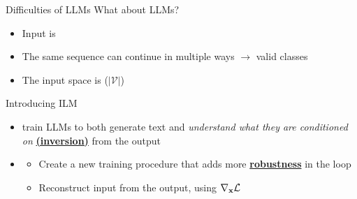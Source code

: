 \begin{frame}{Difficulties of LLMs}
    What about LLMs?

    \begin{itemize}
        \item Input is 
        \item The same sequence can continue in multiple ways $\rightarrow$  valid classes
        \item The input space is  ($|\mathcal{V}|$)
    \end{itemize}
\end{frame}

\begin{frame}{Introducing ILM}
    \begin{itemize}
        \item {} train LLMs to both generate text and \emph{understand what they are conditioned on} 
        \underline{\textbf{(inversion)}}
        from the output
        \item {}
            \begin{itemize}
                \item Create a new training procedure that adds more \underline{\textbf{robustness}} in the loop
                \item Reconstruct input from the output, using $\nabla_{\mathbf{x}} \mathcal{L}$
            \end{itemize}
    \end{itemize}
\end{frame}

